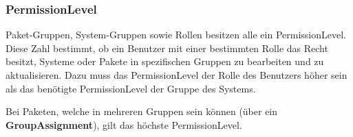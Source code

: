 \subsubsection{PermissionLevel} \label{sec:domain:permission_level}

Paket-Gruppen, System-Gruppen sowie Rollen besitzen alle ein PermissionLevel. Diese Zahl bestimmt, ob ein Benutzer mit einer bestimmten Rolle das Recht besitzt, Systeme oder Pakete in spezifischen Gruppen zu bearbeiten und zu aktualisieren. Dazu muss das PermissionLevel der Rolle des Benutzers höher sein als das benötigte PermissionLevel der Gruppe des Systems.

Bei Paketen, welche in mehreren Gruppen sein können (über ein \textbf{GroupAssignment}), gilt das höchste PermissionLevel.